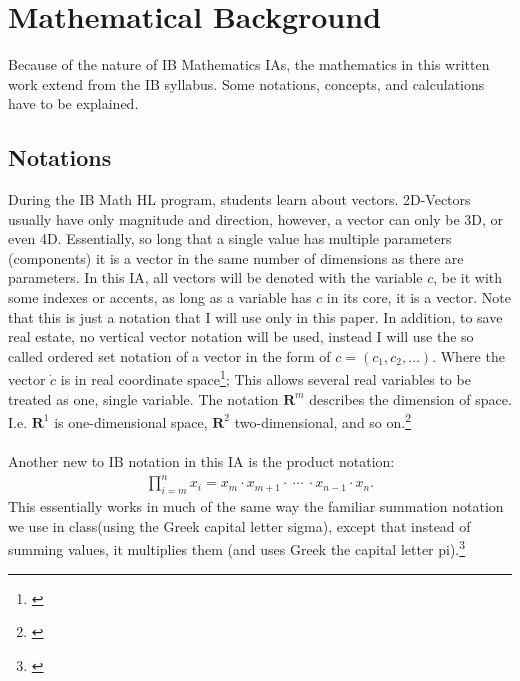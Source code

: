 \section{Mathematical Background}
Because of the nature of IB Mathematics IAs, the mathematics in this written work extend from the IB syllabus. Some notations, concepts, and calculations have to be explained. 

\subsection{Notations}
During the IB Math HL program, students learn about vectors. 2D-Vectors usually have only magnitude and direction, however, a vector can only be 3D, or even 4D. Essentially, so long that a single value has multiple parameters (components) it is a vector in the same number of dimensions as there are parameters. In this IA, all vectors will be denoted with the variable $c$, be it with some indexes or accents, as long as a variable has $c$ in its core, it is a vector. Note that this is just a notation that I will use only in this paper. In addition, to save real estate, no vertical vector notation will be used, instead I will use the so called ordered set notation of a vector in the form of $c=(c_{1},c_{2},\dots)$. Where the vector $\dot{c}$ is in real coordinate space\footnote{\cite{kelley_1995}}; This allows several real variables to be treated as one, single variable. The notation $\boldsymbol{R}^{m}$ describes the dimension of space. I.e. $\boldsymbol{R}^{1}$ is one-dimensional space, $\boldsymbol{R}^{2}$ two-dimensional, and so on.\footnote{\cite{Weisstein_2014}} \\
\\
Another new to IB notation in this IA is the product notation:
\begin{gather*}
\prod\limits_{i = m}^{n} x_{i} = x_{m} \cdot x_{m+1} \cdot \  \cdots \  \cdot x_{n-1} \cdot x_{n}.
\end{gather*}
This essentially works in much of the same way the familiar summation notation we use in class(using the Greek capital letter sigma), except that instead of summing values, it multiplies them (and uses Greek the capital letter pi).\footnote{\cite{product_1995}}
